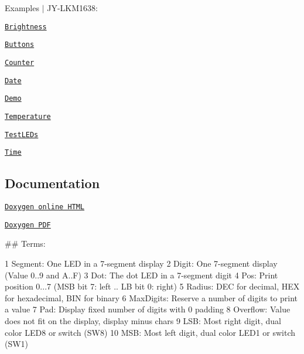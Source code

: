 Examples $\vert$ J\+Y-\/\+L\+K\+M1638\+:
\begin{DoxyItemize}
\item \href{https://github.com/Erriez/ErriezLKM1638/blob/master/examples/Brightness/Brightness.ino}{\tt Brightness}
\item \href{https://github.com/Erriez/ErriezLKM1638/blob/master/examples/Buttons/Buttons.ino}{\tt Buttons}
\item \href{https://github.com/Erriez/ErriezLKM1638/blob/master/examples/Counter/Counter.ino}{\tt Counter}
\item \href{https://github.com/Erriez/ErriezLKM1638/blob/master/examples/Date/Date.ino}{\tt Date}
\item \href{https://github.com/Erriez/ErriezLKM1638/blob/master/examples/Demo/Demo.ino}{\tt Demo}
\item \href{https://github.com/Erriez/ErriezLKM1638/blob/master/examples/Temperature/Temperature.ino}{\tt Temperature}
\item \href{https://github.com/Erriez/ErriezLKM1638/blob/master/examples/TestLEDs/TestLEDs.ino}{\tt Test\+L\+E\+Ds}
\item \href{https://github.com/Erriez/ErriezLKM1638/blob/master/examples/Time/Time.ino}{\tt Time}
\end{DoxyItemize}

\subsection*{Documentation}


\begin{DoxyItemize}
\item \href{https://erriez.github.io/ErriezLKM1638}{\tt Doxygen online H\+T\+ML}
\item \href{https://github.com/Erriez/ErriezLKM1638/raw/gh-pages/latex/ErriezLKM1638.pdf}{\tt Doxygen P\+DF}
\end{DoxyItemize}

\#\# Terms\+: 
\begin{DoxyCode}
1 Segment:   One LED in a 7-segment display
2 Digit:     One 7-segment display (Value 0..9 and A..F)
3 Dot:       The dot LED in a 7-segment digit
4 Pos:       Print position 0...7 (MSB bit 7: left .. LB bit 0: right)
5 Radius:    DEC for decimal, HEX for hexadecimal, BIN for binary
6 MaxDigits: Reserve a number of digits to print a value
7 Pad:       Display fixed number of digits with 0 padding
8 Overflow:  Value does not fit on the display, display minus chars
9 LSB:       Most right digit, dual color LED8 or switch (SW8)
10 MSB:       Most left digit,  dual color LED1 or switch (SW1)
\end{DoxyCode}


